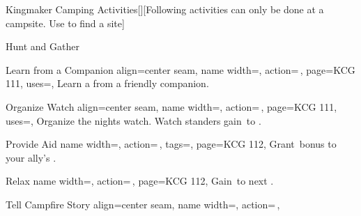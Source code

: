 \begin{PageFront}
\begin{Tables}{\frontTableHeight}
\begin{Table}{Kingmaker Camping Activities}[][Following activities can only be done at a campsite. Use
         to find a site]
\begin{entry}{Hunt and Gather}
                \hfill
                \hfill
            \end{entry}
            \begin{entry}{Learn from a Companion}{%
                align=center seam,
                name width=\activityLength,%
                action=\,,
                page=KCG 111,
                uses={\Perception[][val=20]},
            }
                Learn a  from a friendly companion. \hfill {}\\ \hfill {}
            \end{entry}
            \begin{entry}{Organize Watch}{%
                align=center seam,
                name width=\activityLength,%
                action=\,,
                page=KCG 111,
                uses={\Perception[tags=E]},
            }
                Organize the nights watch. Watch standers gain \,\Status to \PerceptionT. \\
                 \hfill
                \quad {}
            \end{entry}
            \begin{entry}{Provide Aid}{%
                name width=\activityLength,%
                action=\,,
                tags=\Concentrate,
                page=KCG 112,
            }
                Grant \,\Cirm bonus to your ally's . \hfill {}\quad{}
            \end{entry}
            \begin{entry}{Relax}{%
                name width=\activityLength,%
                action=\,,
                page=KCG 112,
            }
                Gain \,\Cirm to next .
            \end{entry}
            \begin{entry}{Tell Campfire Story}{%
                align=center seam,
                name width=\activityLength,%
                action=\,,
}
\end{entry}
\end{Table}
\end{Tables}
\end{PageFront}
